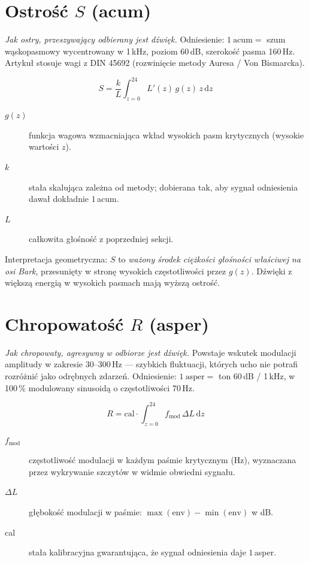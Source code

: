 \documentclass[11pt,a4paper]{article}
\begin{document}
\section{Ostrość \texorpdfstring{$S$}{S} (acum)}

\textit{Jak ostry, przeszywający odbierany jest dźwięk.} Odniesienie:
$1\ \text{acum} = $ szum wąskopasmowy wycentrowany w 1\,kHz, poziom 60\,dB,
szerokość pasma 160\,Hz. Artykuł stosuje wagi z DIN 45692 (rozwinięcie metody
Auresa / Von Bismarcka).

\[
  S = \frac{k}{L} \int_{z=0}^{24} L'(z)\, g(z)\, z\, \mathrm{d}z
\]

\begin{description}
  \item[$g(z)$] funkcja wagowa wzmacniająca wkład wysokich pasm krytycznych
                (wysokie wartości $z$).
  \item[$k$]    stała skalująca zależna od metody; dobierana tak, aby sygnał
                odniesienia dawał dokładnie $1$\,acum.
  \item[$L$]    całkowita głośność z poprzedniej sekcji.
\end{description}

\noindent
Interpretacja geometryczna: $S$ to \emph{ważony środek ciężkości głośności
właściwej na osi Bark}, przesunięty w stronę wysokich częstotliwości przez
$g(z)$. Dźwięki z większą energią w wysokich pasmach mają wyższą ostrość.

\section{Chropowatość \texorpdfstring{$R$}{R} (asper)}

\textit{Jak chropowaty, agresywny w odbiorze jest dźwięk.} Powstaje wskutek
modulacji amplitudy w zakresie $30$--$300$\,Hz --- szybkich fluktuacji, których
ucho nie potrafi rozróżnić jako odrębnych zdarzeń. Odniesienie:
$1\ \text{asper} = $ ton 60\,dB / 1\,kHz, w 100\,\% modulowany sinusoidą o
częstotliwości 70\,Hz.

\[
  R = \mathrm{cal} \cdot \int_{z=0}^{24} f_{\text{mod}}\, \Delta L\, \mathrm{d}z
\]

\begin{description}
  \item[$f_{\text{mod}}$] częstotliwość modulacji w każdym paśmie krytycznym
                          (Hz), wyznaczana przez wykrywanie szczytów w widmie
                          obwiedni sygnału.
  \item[$\Delta L$]       głębokość modulacji w paśmie:
                          $\max(\text{env}) - \min(\text{env})$ w dB.
  \item[cal]              stała kalibracyjna gwarantująca, że sygnał
                          odniesienia daje $1$\,asper.
\end{description}
\end{document}
